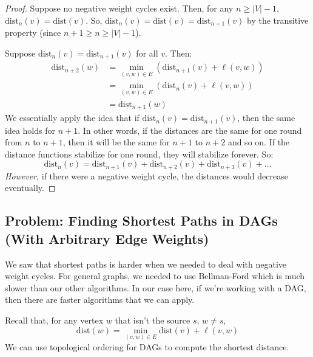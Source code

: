 \documentclass[letterpaper]{article}
\begin{document}
\begin{mdframed}[]
    \begin{proof}
        Suppose no negative weight cycles exist. Then, for any $n \geq |V| - 1$, $\text{dist}_{n}(v) = \text{dist}(v)$. So, $\text{dist}_{n}(v) = \text{dist}(v) = \text{dist}_{n + 1}(v)$ by the transitive property (since $n + 1 \geq n \geq |V| - 1$). 

        \bigskip 

        Suppose $\text{dist}_{n}(v) = \text{dist}_{n + 1}(v)$ for all $v$. Then: 
        \begin{equation*}
            \begin{aligned}
                \text{dist}_{n + 2}(w) &= \min_{(v, w) \in E} (\text{dist}_{n + 1}(v) + \ell(v, w)) \\ 
                    &= \min_{(v, w) \in E} (\text{dist}_{n}(v) + \ell(v, w)) \\
                    &= \text{dist}_{n + 1}(w)
            \end{aligned}
        \end{equation*}
        We essentially apply the idea that if $\text{dist}_{n}(v) = \text{dist}_{n + 1}(v)$, then the same idea holds for $n + 1$. In other words, if the distances are the same for one round from $n$ to $n + 1$, then it will be the same for $n + 1$ to $n + 2$ and so on. If the distance functions stabilize for one round, they will stabilize forever. So: 
        \[\text{dist}_{n}(v) = \text{dist}_{n + 1}(v) + \text{dist}_{n + 2}(v) + \text{dist}_{n + 3}(v) + \dots\]
        \emph{However}, if there were a negative weight cycle, the distances would decrease eventually. 
    \end{proof}
\end{mdframed}


\subsection{Problem: Finding Shortest Paths in DAGs (With Arbitrary Edge Weights)}
We saw that shortest paths is harder when we needed to deal with negative weight cycles. For general graphs, we needed to use Bellman-Ford which is much slower than our other algorithms. In our case here, if we're working with a DAG, then there are faster algorithms that we can apply. 

\bigskip 

Recall that, for any vertex $w$ that isn't the source $s$, $w \neq s$,
\[\text{dist}(w) = \min_{(v, w) \in E} \text{dist}(v) + \ell(v, w)\]
We can use topological ordering for DAGs to compute the shortest distance.
\end{document}
